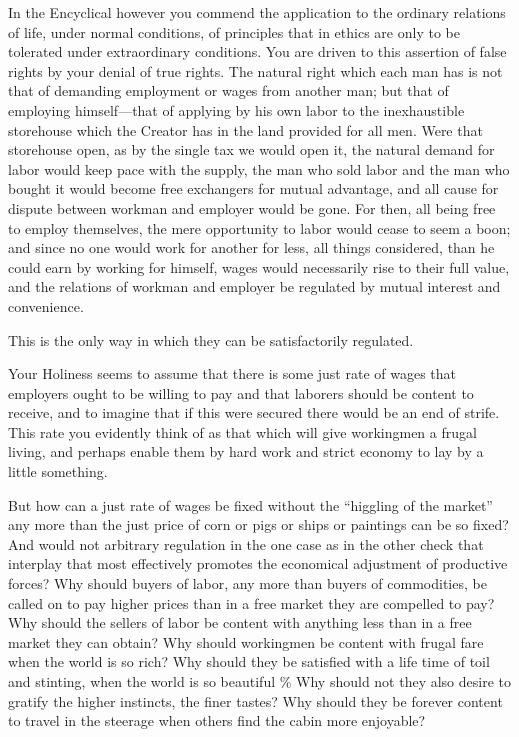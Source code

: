 \documentclass{book}
\begin{document}
In the Encyclical however you commend the application to the ordinary relations of life, under normal conditions, of principles that in ethics are only to be tolerated under extraordinary conditions. You are driven to this assertion of false rights by your denial of true rights. The natural right which each man has is not that of demanding employment or wages from another man; but that of employing himself—that of applying by his own labor to the inexhaustible storehouse which the Creator has in the land provided for all men. Were that storehouse open, as by the single tax we would open it, the natural demand for labor would keep pace with the supply, the man who sold labor and the man who bought it would become free exchangers for mutual advantage, and all cause for dispute between workman and employer would be gone. For then, all being free to employ themselves, the mere opportunity to labor would cease to seem a boon; and since no one would work for another for less, all things considered, than he could earn by working for himself, wages would necessarily rise to their full value, and the relations of workman and employer be regulated by mutual interest and convenience.

This is the only way in which they can be satisfactorily regulated.

Your Holiness seems to assume that there is some just rate of wages that employers ought to be willing to pay and that laborers should be content to receive, and to imagine that if this were secured there would be an end of strife. This rate you evidently think of as that which will give workingmen a frugal living, and perhaps enable them by hard work and strict economy to lay by a little something.

But how can a just rate of wages be fixed without the “higgling of the market” any more than the just price of corn or pigs or ships or paintings can be so fixed? And would not arbitrary regulation in the one case as in the other check that interplay that most effectively promotes the economical adjustment of productive forces? Why should buyers of labor, any more than buyers of commodities, be called on to pay higher prices than in a free market they are compelled to pay? Why should the sellers of labor be content with anything less than in a free market they can obtain? Why should workingmen be content with frugal fare when the world is so rich? Why should they be satisfied with a life time of toil and stinting, when the world is so beautiful \% Why should not they also desire to gratify the higher instincts, the finer tastes? Why should they be forever content to travel in the steerage when others find the cabin more enjoyable?
\end{document}
